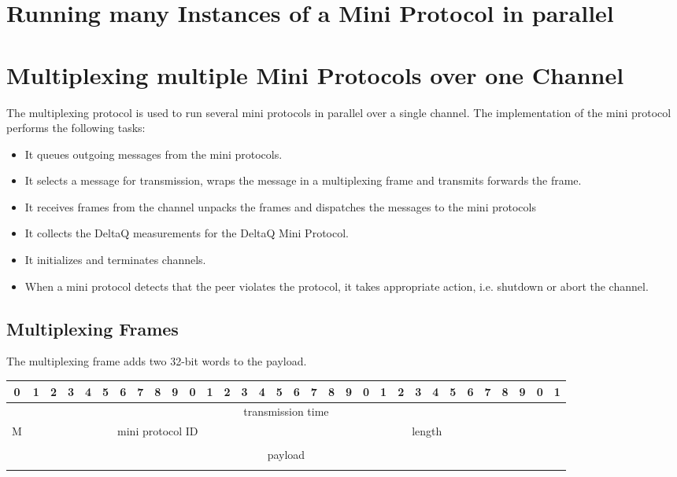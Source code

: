 \documentclass{report}
\newcommand{\wip}[1]{\color{magenta}{#1}\color{black}}
\theoremstyle{definition}{
  \newtheorem{lemma}{Lemma}[section] %
  \newtheorem{definition}[lemma]{Definition}
}
\theoremstyle{theorem}{
  \newtheorem{invariant}[lemma]{Invariant}
  \newtheorem{proofobligation}[lemma]{Proof Obligation}
}
\numberwithin{equation}{lemma}
\begin{document}
\section{Running many Instances of a Mini Protocol in parallel}
\wip{WIP Pipelining}

\section{Multiplexing multiple Mini Protocols over one Channel}
\label{multiplexing}
The multiplexing protocol is used to run several mini protocols in parallel over a single
channel.
The implementation of the mini protocol performs the following tasks:
\begin{itemize}
\item
  It queues outgoing messages from the mini protocols.
\item
  It selects a message for transmission, wraps the message in a multiplexing frame
  and transmits forwards the frame.
\item
  It receives frames from the channel unpacks the frames and dispatches
  the messages to the mini protocols
\item
  It collects the DeltaQ measurements for the DeltaQ Mini Protocol.
\item
  It initializes and terminates channels.
\item
  When a mini protocol detects that the peer violates the protocol, it takes appropriate action,
  i.e. shutdown or abort the channel.
\end{itemize}

\subsection{Multiplexing Frames}
The multiplexing frame adds two 32-bit words to the payload.

\begingroup
\setlength{\tabcolsep}{3pt}
\begin{tabular}{|c|c|c|c|c|c|c|c|c|c|c|c|c|c|c|c|c|c|c|c|c|c|c|c|c|c|c|c|c|c|c|c|}
  \hline
  0&1&2&3&4&5&6&7&8&9&0&1&2&3&4&5&6&7&8&9&0&1&2&3&4&5&6&7&8&9&0&1 \\ \hline
  \multicolumn{32}{|c|}{transmission time} \\ \hline
  \multicolumn{1}{|c|}{M}
  &\multicolumn{15}{|c|}{mini protocol ID}
  &\multicolumn{16}{|c|}{length} \\ \hline
  \multicolumn{32}{|c|}{} \\
  \multicolumn{32}{|c|}{payload} \\
  \multicolumn{32}{|c|}{} \\ \hline
\end{tabular}
\endgroup
\end{document}
